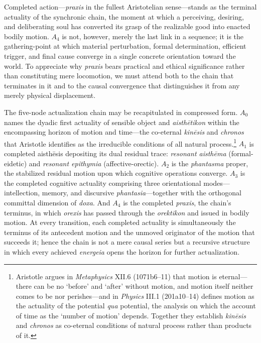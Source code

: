 Completed action---\textit{praxis} in the fullest Aristotelian sense---stands as the terminal actuality of the synchronic chain, the moment at which a perceiving, desiring, and deliberating soul has converted its grasp of the realizable good into enacted bodily motion. $A_4$ is not, however, merely the last link in a sequence; it is the gathering-point at which material perturbation, formal determination, efficient trigger, and final cause converge in a single concrete orientation toward the world. To appreciate why \textit{praxis} bears practical and ethical significance rather than constituting mere locomotion, we must attend both to the chain that terminates in it and to the causal convergence that distinguishes it from any merely physical displacement.

The five-node actualization chain may be recapitulated in compressed form. $A_0$ names the dyadic first actuality of sensible object and \textit{aisth\={e}tikon} within the encompassing horizon of motion and time---the co-eternal \textit{kin\={e}sis} and \textit{chronos} that Aristotle identifies as the irreducible conditions of all natural process.\footnote{Aristotle argues in \textit{Metaphysics} XII.6 (1071b6--11) that motion is eternal---there can be no `before' and `after' without motion, and motion itself neither comes to be nor perishes---and in \textit{Physics} III.1 (201a10--14) defines motion as the actuality of the potential \textit{qua} potential, the analysis on which the account of time as the `number of motion' depends. Together they establish \textit{kin\={e}sis} and \textit{chronos} as co-eternal conditions of natural process rather than products of it.} $A_1$ is completed aisthēsis depositing its dual residual trace: \textit{resonant aisth\={e}ma} (formal-eidetic) and \textit{resonant epithymia} (affective-orectic). $A_2$ is the \textit{phantasma} proper, the stabilized residual motion upon which cognitive operations converge. $A_3$ is the completed cognitive actuality comprising three orientational modes---intellection, memory, and discursive \textit{phantasia}---together with the orthogonal committal dimension of \textit{doxa}. And $A_4$ is the completed \textit{praxis}, the chain's terminus, in which \textit{orexis} has passed through the \textit{orektikon} and issued in bodily motion. At every transition, each completed actuality is simultaneously the terminus of its antecedent motion and the unmoved originator of the motion that succeeds it; hence the chain is not a mere causal series but a recursive structure in which every achieved \textit{energeia} opens the horizon for further actualization.

